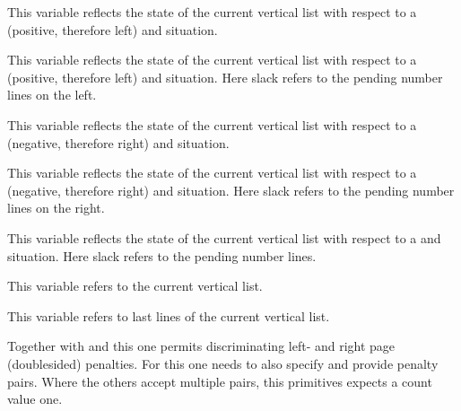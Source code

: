 This variable reflects the state of the current vertical list with respect to a
(positive, therefore left)  and 
situation.

\stopnewprimitive

\startnewprimitive[title={\prm {breaklasthangleftslack}}]

This variable reflects the state of the current vertical list with respect to a
(positive, therefore left)  and 
situation. Here slack refers to the pending number lines on the left.

\stopnewprimitive

\startnewprimitive[title={\prm {breaklasthangrightindent}}]

This variable reflects the state of the current vertical list with respect to a
(negative, therefore right)  and 
situation.

\stopnewprimitive

\startnewprimitive[title={\prm {breaklasthangrightslack}}]

This variable reflects the state of the current vertical list with respect to a
(negative, therefore right)  and 
situation. Here slack refers to the pending number lines on the right.

\stopnewprimitive

\startnewprimitive[title={\prm {breaklasthangslack}}]

This variable reflects the state of the current vertical list with respect to a
 and  situation. Here slack refers to the
pending number lines.

\stopnewprimitive

\startnewprimitive[title={\prm {breaklastlinecount}}]

This variable refers to the current vertical list.

\stopnewprimitive

\startnewprimitive[title={\prm {breaklastlinewidth}}]

This variable refers to last lines of the current vertical list.

\stopnewprimitive

\startnewprimitive[title={\prm {brokenpenalties}}]

Together with  and  this one permits
discriminating left- and right page (doublesided) penalties. For this one needs
to also specify  and provide penalty pairs. Where the others
accept multiple pairs, this primitives expects a count value one.

